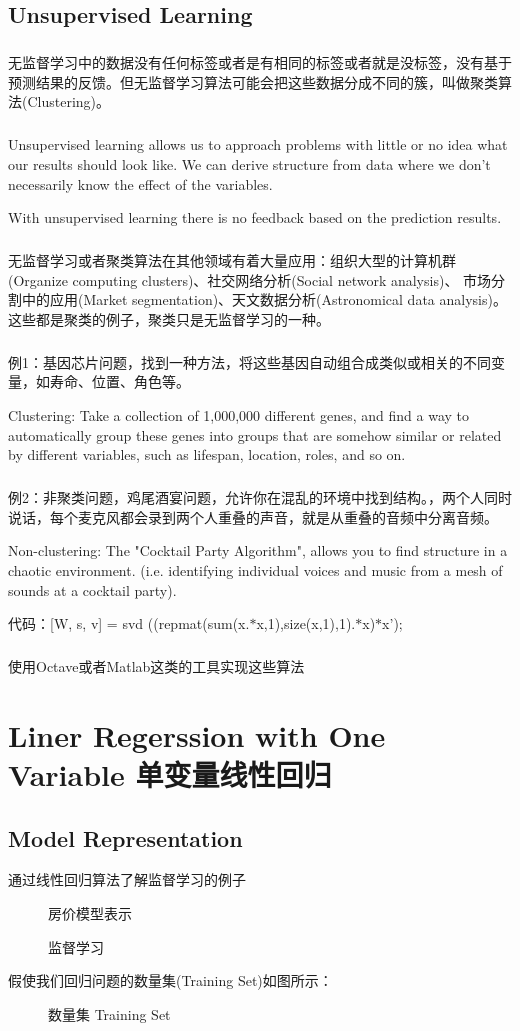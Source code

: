\documentclass{article}
\begin{document}
\begin{CJK}{UTF8}{gbsn}
\subsection{Unsupervised Learning}
\subparagraph*{}
无监督学习中的数据没有任何标签或者是有相同的标签或者就是没标签，没有基于预测结果的反馈。但无监督学习算法可能会把这些数据分成不同的簇，叫做聚类算法(Clustering)。
\subparagraph*{}
Unsupervised learning allows us to approach problems with little or no idea what our results should look like. We can derive structure from data where we don't necessarily know the effect of the variables.

With unsupervised learning there is no feedback based on the prediction results.
\subparagraph*{}
无监督学习或者聚类算法在其他领域有着大量应用：组织大型的计算机群(Organize computing clusters)、社交网络分析(Social network analysis)、
市场分割中的应用(Market segmentation)、天文数据分析(Astronomical data analysis)。这些都是聚类的例子，聚类只是无监督学习的一种。
\subparagraph*{}
例1：基因芯片问题，找到一种方法，将这些基因自动组合成类似或相关的不同变量，如寿命、位置、角色等。

Clustering: Take a collection of 1,000,000 different genes, and find a way to automatically group these genes into groups that are somehow similar or related by different variables, such as lifespan, location, roles, and so on.
\subparagraph*{}
例2：非聚类问题，鸡尾酒宴问题，允许你在混乱的环境中找到结构。，两个人同时说话，每个麦克风都会录到两个人重叠的声音，就是从重叠的音频中分离音频。

Non-clustering: The "Cocktail Party Algorithm", allows you to find structure in a chaotic environment. (i.e. identifying individual voices and music from a mesh of sounds at a cocktail party).

代码：[W, s, v] = svd ((repmat(sum(x.$*$x,1),size(x,1),1).$*$x)$*$x');
\subparagraph*{}
使用Octave或者Matlab这类的工具实现这些算法
\section{Liner Regerssion with One Variable 单变量线性回归}
\subsection{Model Representation}
通过线性回归算法了解监督学习的例子
\begin{figure}[H]
\caption{房价模型表示}
\label{fig:3}
\end{figure}
\begin{figure}[H]
\caption{监督学习}
\label{fig:4}
\end{figure}
假使我们回归问题的数量集(Training Set)如图所示：
\begin{figure}[H]
\caption{数量集 Training Set}
\label{fig:5}
\end{figure}


\end{CJK}
\end{document}
